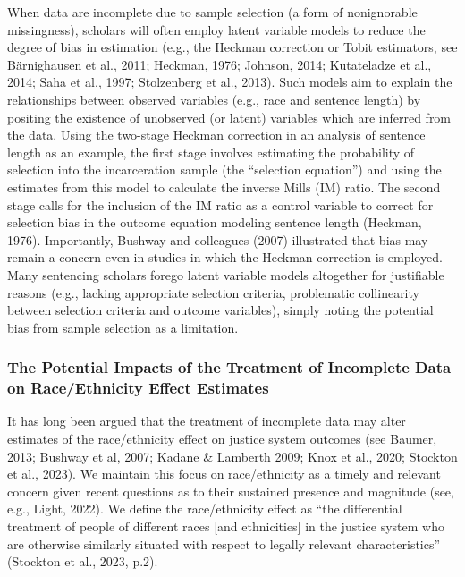 \documentclass[
  letterpaper,
  DIV=11,
  numbers=noendperiod]{scrartcl}
\begin{document}
When data are incomplete due to sample selection (a form of nonignorable
missingness), scholars will often employ latent variable models to
reduce the degree of bias in estimation (e.g., the Heckman correction or
Tobit estimators, see Bärnighausen et al., 2011; Heckman, 1976; Johnson,
2014; Kutateladze et al., 2014; Saha et al., 1997; Stolzenberg et al.,
2013). Such models aim to explain the relationships between observed
variables (e.g., race and sentence length) by positing the existence of
unobserved (or latent) variables which are inferred from the data. Using
the two-stage Heckman correction in an analysis of sentence length as an
example, the first stage involves estimating the probability of
selection into the incarceration sample (the ``selection equation'') and
using the estimates from this model to calculate the inverse Mills (IM)
ratio. The second stage calls for the inclusion of the IM ratio as a
control variable to correct for selection bias in the outcome equation
modeling sentence length (Heckman, 1976). Importantly, Bushway and
colleagues (2007) illustrated that bias may remain a concern even in
studies in which the Heckman correction is employed. Many sentencing
scholars forego latent variable models altogether for justifiable
reasons (e.g., lacking appropriate selection criteria, problematic
collinearity between selection criteria and outcome variables), simply
noting the potential bias from sample selection as a limitation.

\hypertarget{the-potential-impacts-of-the-treatment-of-incomplete-data-on-raceethnicity-effect-estimates}{%
\subsubsection{The Potential Impacts of the Treatment of Incomplete Data
on Race/Ethnicity Effect
Estimates}\label{the-potential-impacts-of-the-treatment-of-incomplete-data-on-raceethnicity-effect-estimates}}

It has long been argued that the treatment of incomplete data may alter
estimates of the race/ethnicity effect on justice system outcomes (see
Baumer, 2013; Bushway et al, 2007; Kadane \& Lamberth 2009; Knox et al.,
2020; Stockton et al., 2023). We maintain this focus on race/ethnicity
as a timely and relevant concern given recent questions as to their
sustained presence and magnitude (see, e.g., Light, 2022). We define the
race/ethnicity effect as ``the differential treatment of people of
different races {[}and ethnicities{]} in the justice system who are
otherwise similarly situated with respect to legally relevant
characteristics'' (Stockton et al., 2023, p.2).
\end{document}
